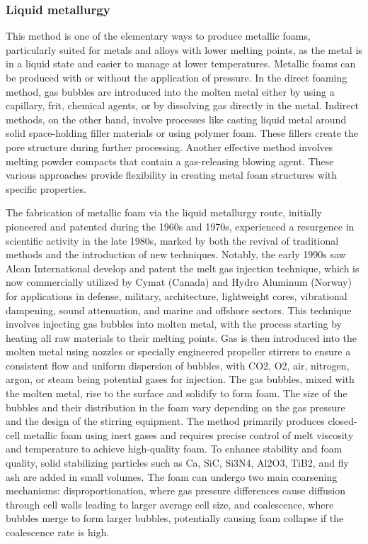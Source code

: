 \documentclass[a4paper]{article}
\begin{document}
\subsubsection{Liquid metallurgy}
This method is one of the elementary ways to produce metallic foams, particularly suited for metals and alloys with lower melting points, as the metal is in a liquid state and easier to manage at lower temperatures. 
Metallic foams can be produced with or without the application of pressure.
In the direct foaming method, gas bubbles are introduced into the molten metal either by using a capillary, frit, chemical agents, or by dissolving gas directly in the metal. 
Indirect methods, on the other hand, involve processes like casting liquid metal around solid space-holding filler materials or using polymer foam. These fillers create the pore structure during further processing. 
Another effective method involves melting powder compacts that contain a gas-releasing blowing agent. These various approaches provide flexibility in creating metal foam structures with specific properties.

\pagebreak

\noindent The fabrication of metallic foam via the liquid metallurgy route, initially pioneered and patented during the 1960s and 1970s, experienced a resurgence in scientific activity in the late 1980s, marked by both the revival of traditional methods and the introduction of new techniques. 
Notably, the early 1990s saw Alcan International develop and patent the melt gas injection technique, which is now commercially utilized by Cymat (Canada) and Hydro Aluminum (Norway) for applications in defense, military, architecture, lightweight cores, vibrational dampening, sound attenuation, and marine and offshore sectors. 
This technique involves injecting gas bubbles into molten metal, with the process starting by heating all raw materials to their melting points. Gas is then introduced into the molten metal using nozzles or specially engineered propeller stirrers to ensure a consistent flow and uniform dispersion of bubbles, with CO2, O2, air, nitrogen, argon, or steam being potential gases for injection. 
The gas bubbles, mixed with the molten metal, rise to the surface and solidify to form foam. The size of the bubbles and their distribution in the foam vary depending on the gas pressure and the design of the stirring equipment. The method primarily produces closed-cell metallic foam using inert gases and requires precise control of melt viscosity and temperature to achieve high-quality foam. 
To enhance stability and foam quality, solid stabilizing particles such as Ca, SiC, Si3N4, Al2O3, TiB2, and fly ash are added in small volumes. The foam can undergo two main coarsening mechanisms: disproportionation, where gas pressure differences cause diffusion through cell walls leading to larger average cell size, and coalescence, where bubbles merge to form larger bubbles, potentially causing foam collapse if the coalescence rate is high.
\end{document}

